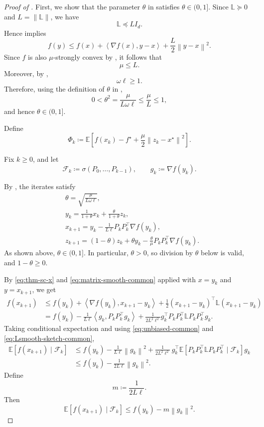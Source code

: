 \documentclass[10pt]{article}
\newcommand{\E}{\mathbb{E}}
\newcommand{\F}{\mathcal{F}}
\newcommand{\ip}[2]{\left\langle #1,#2\right\rangle}
\newcommand{\norm}[1]{\left\|#1\right\|}
\newcommand{\Lmat}{\mathbb{L}}
\begin{document}
\begin{proof}[Proof of ]
First, we show that the parameter \(\theta\) in 
satisfies \(\theta\in(0,1]\). Since \(\Lmat\succeq0\) and \(L=\|\Lmat\|\),
we have
\[
\Lmat\preceq LI_d.
\]
Hence  implies
\[
f(y)\le f(x)+\ip{\nabla f(x)}{y-x}+\frac{L}{2}\norm{y-x}^2.
\]
Since \(f\) is also \(\mu\)-strongly convex by , it follows that
\[
\mu\le L.
\]
Moreover, by ,
\[
\omega\ell\ge 1.
\]
Therefore, using the definition of \(\theta\) in ,
\[
0<\theta^2=\frac{\mu}{L\omega\ell}\le \frac{\mu}{L}\le 1,
\]
and hence \(\theta\in(0,1]\).

Define
\[
\Phi_k\coloneqq\E\!\left[
f(x_k)-f^\star+\frac{\mu}{2}\norm{z_k-x^\star}^2
\right].
\]

Fix \(k\ge 0\), and let
\[
\F_k\coloneqq\sigma(P_0,\dots,P_{k-1}),
\qquad
g_k\coloneqq\nabla f(y_k).
\]

By , the iterates satisfy
\begin{align}
&\theta = \sqrt{\frac{\mu}{L\omega\ell}}, \label{eq:thm-sc-theta}\\
&y_k = \frac{1}{1+\theta}x_k + \frac{\theta}{1+\theta}z_k, \label{eq:thm-sc-y}\\
&x_{k+1} = y_k - \frac{1}{L\ell}P_kP_k^\top \nabla f(y_k), \label{eq:thm-sc-x}\\
&z_{k+1} = (1-\theta)z_k + \theta y_k - \frac{\theta}{\mu}P_kP_k^\top \nabla f(y_k). \label{eq:thm-sc-z}
\end{align}
As shown above, \(\theta\in(0,1]\). 
In particular, \(\theta>0\), so division by \(\theta\) below is valid, and
\(1-\theta\ge 0\).


By \eqref{eq:thm-sc-x} and \eqref{eq:matrix-smooth-common} applied with
\(x=y_k\) and \(y=x_{k+1}\), we get
\begin{align}
f(x_{k+1})
&\le f(y_k)+\ip{\nabla f(y_k)}{x_{k+1}-y_k}
+\frac12 (x_{k+1}-y_k)^\top \Lmat (x_{k+1}-y_k) \\
&= f(y_k) - \frac{1}{L\ell}\ip{g_k}{P_kP_k^\top g_k}
    + \frac{1}{2L^2\ell^2} g_k^\top P_kP_k^\top \Lmat P_kP_k^\top g_k.
\end{align}
Taking conditional expectation and using \eqref{eq:unbiased-common} and \eqref{eq:Lsmooth-sketch-common},
\begin{align}
\E[f(x_{k+1})\mid \F_k]
&\le f(y_k) - \frac{1}{L\ell}\norm{g_k}^2
    + \frac{1}{2L^2\ell^2}\, g_k^\top \E[P_kP_k^\top\Lmat P_kP_k^\top\mid \F_k] g_k \\
&\le f(y_k) - \frac{1}{2L\ell}\norm{g_k}^2.
\end{align}
Define
\begin{equation}
m \coloneqq \frac{1}{2L\ell}.
\label{eq:mt}
\end{equation}
Then
\begin{equation}
\E[f(x_{k+1})\mid \F_k] \le f(y_k) - m \norm{g_k}^2.
\label{eq:x-step-bound}
\end{equation}



\end{proof}
\end{document}
